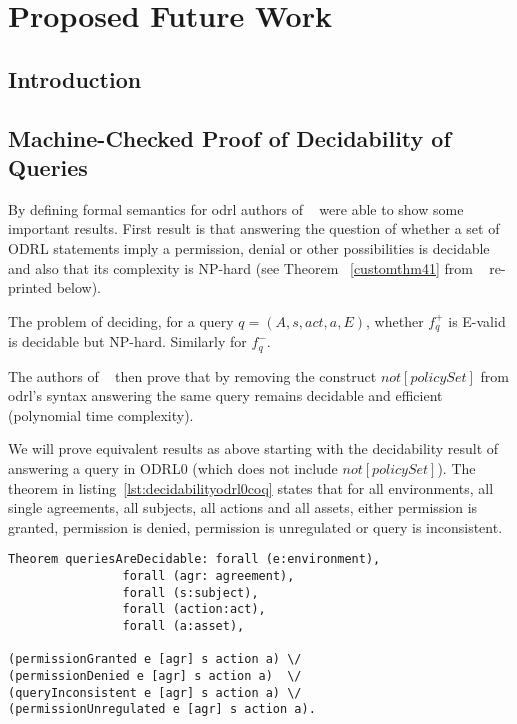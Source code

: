 \chapter{Proposed Future Work}

\section{Introduction}


\section{Machine-Checked Proof of Decidability of Queries}

By defining formal semantics for \ac{odrl} authors of ~\cite{pucella2006} were able to show some important results. First result is that answering the question of whether a set of ODRL statements imply a permission, denial or other possibilities is decidable and also that its complexity is NP-hard (see Theorem ~\ref{customthm41} from ~\cite{pucella2006} re-printed below).

\begin{customthm}{4.1}\label{customthm41}
The problem of deciding, for a query $q = (A, s, act, a, E)$, whether $f^{+}_q$ is E-valid is decidable but NP-hard. Similarly for $f^{-}_q$.
\end{customthm}

The authors of ~\cite{pucella2006} then prove that by removing the construct $not[policySet]$ from \ac{odrl}'s syntax answering the same query remains decidable and efficient (polynomial time complexity). 

We will prove equivalent results as above starting with the decidability result of answering a query in ODRL0 (which does not include $not[policySet]$). The theorem in listing~\ref{lst:decidabilityodrl0coq} states that for all environments, all single agreements, all subjects, all actions and all assets, either permission is granted, permission is denied, permission is unregulated or query is inconsistent. 

\begin{minipage}[c]{0.95\textwidth}
\begin{lstlisting}
Theorem queriesAreDecidable: forall (e:environment), 
                forall (agr: agreement),
                forall (s:subject),
                forall (action:act),
                forall (a:asset),

(permissionGranted e [agr] s action a) \/
(permissionDenied e [agr] s action a)  \/
(queryInconsistent e [agr] s action a) \/
(permissionUnregulated e [agr] s action a).

\end{lstlisting}
\end{minipage}

